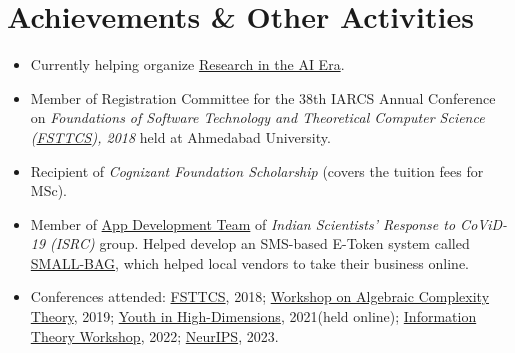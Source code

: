 \documentclass[10pt,a4paper,roman,colorlinks,linkcolor=true]{moderncv}        %
\begin{document}
\section{Achievements \& Other Activities}
\begin{minipage}{\maincolumnwidth}%
  \small{
    \begin{itemize}

      \item Currently helping organize \href{https://solar.cs.umass.edu/ai-era/}{Research in the AI Era}.
      \item Member of Registration Committee for the 38th IARCS Annual Conference on \textit{Foundations of Software Technology and Theoretical Computer Science (\href{https://www.fsttcs.org.in/archives/2018/}{FSTTCS}), 2018} held at Ahmedabad University.
      \item Recipient of \textit{Cognizant Foundation Scholarship} (covers the tuition fees for MSc).
      \item Member of \href{https://indscicov.in/about-us/app-development-team/}{App Development Team} of \textit{Indian Scientists’ Response to CoViD-19 (ISRC)} group. Helped develop an SMS-based E-Token system called \href{https://indscicov.in/for-scientists-healthcare-professionals/app-development/}{SMALL-BAG}, which helped local vendors to take their business online.
      \item Conferences attended: \href{https://www.fsttcs.org.in/archives/2018/}{FSTTCS}, 2018; \href{https://www.icts.res.in/discussion-meeting/wact2019}{Workshop on Algebraic Complexity Theory}, 2019; \href{http://indico.ictp.it/event/9596/}{Youth in High-Dimensions}, 2021(held online); \href{https://itw2022.in/}{Information Theory Workshop}, 2022; \href{https://neurips.cc/Conferences/2023}{NeurIPS}, 2023.
    \end{itemize}}%
\end{minipage}%



\end{document}
